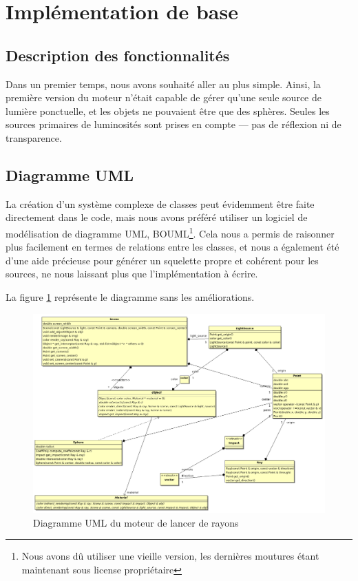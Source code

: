 \documentclass{article}
\begin{document}
\section{Implémentation de base}
\subsection{Description des fonctionnalités}
Dans un premier temps, nous avons souhaité aller au plus simple. Ainsi, la première version du moteur
n'était capable de gérer qu'une seule source de lumière ponctuelle, et les objets ne pouvaient être que 
des sphères. Seules les sources primaires de luminosités sont prises en compte — pas de réflexion ni de
transparence.

\subsection{Diagramme UML}
La création d'un système complexe de classes peut évidemment être faite directement dans le code, 
mais nous avons préféré utiliser un logiciel de modélisation de diagramme UML, BOUML\footnote{Nous
    avons dû utiliser une vieille version, les dernières moutures étant maintenant sous license
propriétaire}. Cela nous a permis de raisonner plus facilement en termes de relations entre les
classes, et nous a également été d'une aide précieuse pour générer un squelette propre et cohérent
pour les sources, ne nous laissant plus que l'implémentation à écrire.

La figure \ref{UML} représente le diagramme sans les améliorations.

\begin{figure}[hbtp]
    \caption{Diagramme UML du moteur de lancer de rayons}
    \label{UML}
    \begin{center}
        \includegraphics[scale=0.35]{UML}
    \end{center}
\end{figure}
\end{document}
